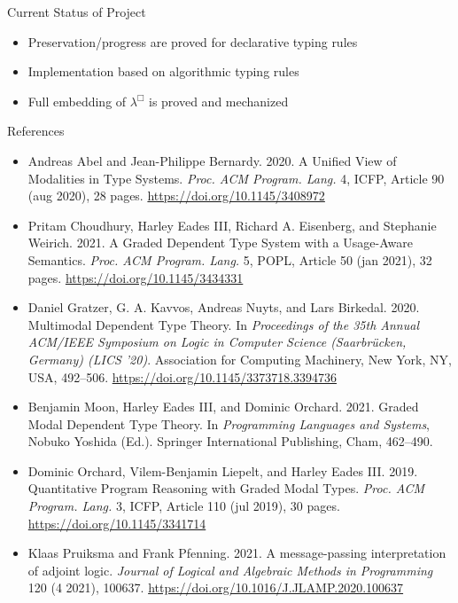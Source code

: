 \documentclass[letterpaper,12pt,aspectratio=169,show notes,dvipsnames]{beamer}
\begin{document}
\begin{frame}{Current Status of Project}
  \begin{itemize}
  \item Preservation/progress are proved for declarative typing rules
  \item Implementation based on algorithmic typing rules
  \item Full embedding of \(\lambda^{\Box}\) is proved and mechanized
  \end{itemize}
\end{frame}

\begin{frame}{References}
  \scriptsize
  \begin{itemize}
  \item Andreas Abel and Jean-Philippe Bernardy. 2020. A Unified View of Modalities in Type Systems. \textit{Proc. ACM Program. Lang.} 4, ICFP, Article 90 (aug 2020), 28 pages. \url{https://doi.org/10.1145/3408972}
  \item Pritam Choudhury, Harley Eades III, Richard A. Eisenberg, and Stephanie Weirich. 2021. A Graded Dependent Type System with a Usage-Aware Semantics. \textit{Proc. ACM Program. Lang.} 5, POPL, Article 50 (jan 2021), 32 pages. \url{https://doi.org/10.1145/3434331}
  \item Daniel Gratzer, G. A. Kavvos, Andreas Nuyts, and Lars Birkedal. 2020. Multimodal Dependent Type Theory. In \textit{Proceedings of the 35th Annual ACM/IEEE Symposium on Logic in Computer Science (Saarbrücken, Germany) (LICS ’20)}. Association for Computing Machinery, New York, NY, USA, 492–506. \url{https://doi.org/10.1145/3373718.3394736}
  \item Benjamin Moon, Harley Eades III, and Dominic Orchard. 2021. Graded Modal Dependent Type Theory. In \textit{Programming Languages and Systems}, Nobuko Yoshida (Ed.). Springer International Publishing, Cham, 462–490.
  \item Dominic Orchard, Vilem-Benjamin Liepelt, and Harley Eades III. 2019. Quantitative Program Reasoning with Graded Modal Types. \textit{Proc. ACM Program. Lang.} 3, ICFP, Article 110 (jul 2019), 30 pages. \url{https://doi.org/10.1145/3341714}
  \item Klaas Pruiksma and Frank Pfenning. 2021. A message-passing interpretation of adjoint logic. \textit{Journal of Logical and Algebraic Methods in Programming} 120 (4 2021), 100637. \url{https://doi.org/10.1016/J.JLAMP.2020.100637}
  \end{itemize}
\end{frame}
\end{document}
